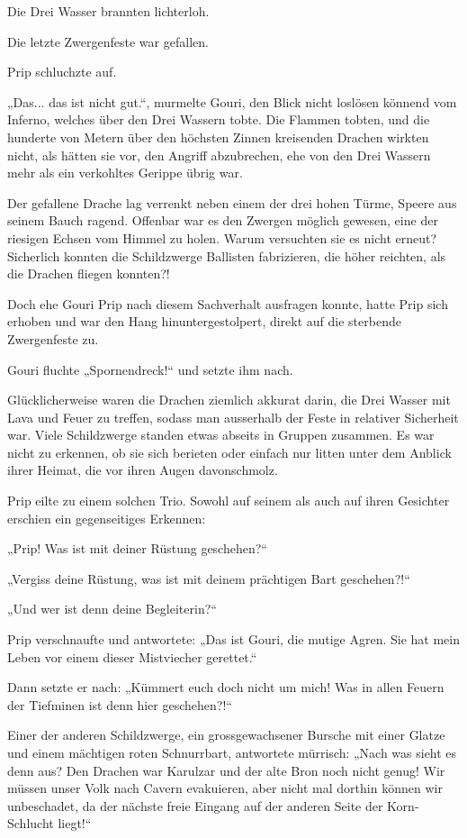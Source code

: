 Die Drei Wasser brannten lichterloh.

Die letzte Zwergenfeste war gefallen.

Prip schluchzte auf.

„Das... das ist nicht gut.“, murmelte Gouri, den Blick nicht loslösen könnend vom Inferno, welches über den Drei Wassern tobte. Die Flammen tobten, und die hunderte von Metern über den höchsten Zinnen kreisenden Drachen wirkten nicht, als hätten sie vor, den Angriff abzubrechen, ehe von den Drei Wassern mehr als ein verkohltes Gerippe übrig war.

Der gefallene Drache lag verrenkt neben einem der drei hohen Türme, Speere aus seinem Bauch ragend. Offenbar war es den Zwergen möglich gewesen, eine der riesigen Echsen vom Himmel zu holen. Warum versuchten sie es nicht erneut? Sicherlich konnten die Schildzwerge Ballisten fabrizieren, die höher reichten, als die Drachen fliegen konnten?!

Doch ehe Gouri Prip nach diesem Sachverhalt ausfragen konnte, hatte Prip sich erhoben und war den Hang hinuntergestolpert, direkt auf die sterbende Zwergenfeste zu.

Gouri fluchte „Spornendreck!“ und setzte ihm nach.

Glücklicherweise waren die Drachen ziemlich akkurat darin, die Drei Wasser mit Lava und Feuer zu treffen, sodass man ausserhalb der Feste in relativer Sicherheit war. Viele Schildzwerge standen etwas abseits in Gruppen zusammen. Es war nicht zu erkennen, ob sie sich berieten oder einfach nur litten unter dem Anblick ihrer Heimat, die vor ihren Augen davonschmolz.

Prip eilte zu einem solchen Trio. Sowohl auf seinem als auch auf ihren Gesichter erschien ein gegenseitiges Erkennen:

„Prip! Was ist mit deiner Rüstung geschehen?“

„Vergiss deine Rüstung, was ist mit deinem prächtigen Bart geschehen?!“

„Und wer ist denn deine Begleiterin?“

Prip verschnaufte und antwortete: „Das ist Gouri, die mutige Agren. Sie hat mein Leben vor einem dieser Mistviecher gerettet.“

Dann setzte er nach: „Kümmert euch doch nicht um mich! Was in allen Feuern der Tiefminen ist denn hier geschehen?!“

Einer der anderen Schildzwerge, ein grossgewachsener Bursche mit einer Glatze und einem mächtigen roten Schnurrbart, antwortete mürrisch: „Nach was sieht es denn aus? Den Drachen war Karulzar und der alte Bron noch nicht genug! Wir müssen unser Volk nach Cavern evakuieren, aber nicht mal dorthin können wir unbeschadet, da der nächste freie Eingang auf der anderen Seite der Korn-Schlucht liegt!“

